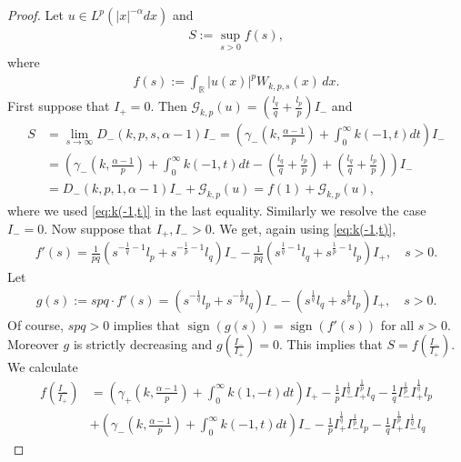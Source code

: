 \documentclass[12pt, a4paper]{amsart}
\DeclareMathOperator{\sign}{sign}
\newcommand{\R}{\mathbb{R}}
\begin{document}
\begin{proof} Let $u \in L^p(|x|^{-\alpha}dx)$
  and
\begin{align*}
    S := \sup_{s > 0}f(s),
\end{align*}
where
\begin{align*}
    f(s) := \int_{\R} |u(x)|^p W_{k,p,s}(x)\,dx.
\end{align*}
First suppose that $I_+ = 0$. Then $\mathcal{G}_{k, p}(u) = \left(\frac{l_q}{q} + \frac{l_p}{p}\right)I_-$ and
\begin{align*}
    S &= \lim_{s \rightarrow \infty}D_-(k, p, s, \alpha - 1)I_- = \left(\gamma_{-}\left(k, \frac{\alpha - 1}{p}\right) + \int_{0}^{\infty}k(-1, t)dt\right)I_-
    \\
    &= \left(\gamma_{-}\left(k, \frac{\alpha - 1}{p}\right) + \int_{0}^{\infty}k(-1, t)dt - \left(\frac{l_q}{q} + \frac{l_p}{p}\right) + \left(\frac{l_q}{q} + \frac{l_p}{p}\right)\right)I_- 
    \\
    &= D_-(k, p, 1, \alpha - 1)I_- + \mathcal{G}_{k, p}(u) = f(1) + \mathcal{G}_{k, p}(u),
\end{align*}
where we used \eqref{eq:k(-1,t)} in the last equality.
Similarly we resolve the case $I_- = 0$. Now suppose that $I_+, I_- > 0$. We get,
again using \eqref{eq:k(-1,t)},
\begin{align*}
    f'(s) = \frac{1}{pq}\left(s^{-\frac{1}{q} - 1}l_p + s^{-\frac{1}{p} - 1}l_q
    \right)I_- - \frac{1}{pq}\left(
    s^{\frac{1}{q} - 1}l_q + s^{\frac{1}{p} - 1}l_p\right)I_+,\quad s>0.
\end{align*}
Let
\begin{align*}
    g(s) := spq \cdot f'(s) =   \left(s^{-\frac{1}{q}}l_p + s^{-\frac{1}{p}}l_q
    \right)I_- - \left(
    s^{\frac{1}{q}}l_q + s^{\frac{1}{p}}l_p\right)I_+, \quad s>0.
\end{align*}
Of course, $spq > 0$ implies that $\sign(g(s)) = \sign(f'(s))$ for all $s > 0$. Moreover $g$ is strictly decreasing and $g\left(\frac{I_-}{I_+}\right)=0$. This implies that $S = f\left( \frac{I_-}{I_+}\right)$. We calculate
\begin{align*}
    f\left( \frac{I_-}{I_+}\right) &= \left( \gamma_{+}\left(k, \frac{\alpha - 1}{p}\right) + \int_{0}^{\infty}k(1, -t)dt \right)I_+ - \frac{1}{p}I_{-}^{\frac{1}{q}}I_{+}^{\frac{1}{p}}l_q - \frac{1}{q}I_{-}^{\frac{1}{p}}I_{+}^{\frac{1}{q}}l_p
    \\
    &+\left( \gamma_{-}\left(k, \frac{\alpha - 1}{p}\right) + \int_{0}^{\infty}k(-1, t)dt \right)I_- - \frac{1}{p}I_{+}^{\frac{1}{q}}I_{-}^{\frac{1}{p}}l_p - \frac{1}{q}I_{+}^{\frac{1}{p}}I_{-}^{\frac{1}{q}}l_q

\end{align*}
\end{proof}
\end{document}
